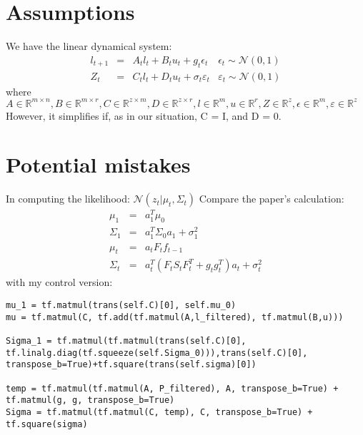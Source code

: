 \documentclass[twoside]{article}
\begin{document}
\section{Assumptions}
We have the linear dynamical system:\[\begin{array}{lclr}l_{t+1} & = & A_{t}l_{t}+B_{t}u_{t}+g_{t}\epsilon_{t}&\epsilon_{t}\sim\mathcal{N}(0,1) \\ Z_{t} & = & C_{t}l_{t} + D_{t}u_{t} + \sigma_{t}\varepsilon_{t} & \varepsilon_{t}\sim\mathcal{N}(0,1)\end{array}\]
where $A\in\mathbb{R}^{m\times n}, B\in\mathbb{R}^{m\times r}, C\in\mathbb{R}^{z\times m}, D\in\mathbb{R}^{z\times r}, l\in\mathbb{R}^{m}, u\in\mathbb{R}^{r}, Z\in\mathbb{R}^{z}, \epsilon\in\mathbb{R}^{m}, \varepsilon\in\mathbb{R}^{z}$
However, it simplifies if, as in our situation, C = I, and D = 0.

\section{Potential mistakes}
In computing the likelihood: $\mathcal{N}(z_{t}|\mu_{t},\Sigma_{t})$
Compare the paper's calculation:\[\begin{array}{lcl} \mu_{1} & = & a_{1}^{T}\mu_{0} \\ \Sigma_{1} & = & a_{1}^{T}\Sigma_{0}a_{1} + \sigma_{1}^{2} \\ \mu_{t} & = & a_{t}F_{t}f_{t-1} \\ \Sigma_{t} & = & a_{t}^{T}(F_{t}S_{t}F_{t}^{T}+g_{t}g_{t}^{T})a_{t}+\sigma_{t}^{2}\end{array}\]
with my control version:
\begin{lstlisting}
mu_1 = tf.matmul(trans(self.C)[0], self.mu_0)
mu = tf.matmul(C, tf.add(tf.matmul(A,l_filtered), tf.matmul(B,u)))

Sigma_1 = tf.matmul(tf.matmul(trans(self.C)[0], tf.linalg.diag(tf.squeeze(self.Sigma_0))),trans(self.C)[0], transpose_b=True)+tf.square(trans(self.sigma)[0])

temp = tf.matmul(tf.matmul(A, P_filtered), A, transpose_b=True) + tf.matmul(g, g, transpose_b=True)
Sigma = tf.matmul(tf.matmul(C, temp), C, transpose_b=True) + tf.square(sigma)
\end{lstlisting}
\end{document}
